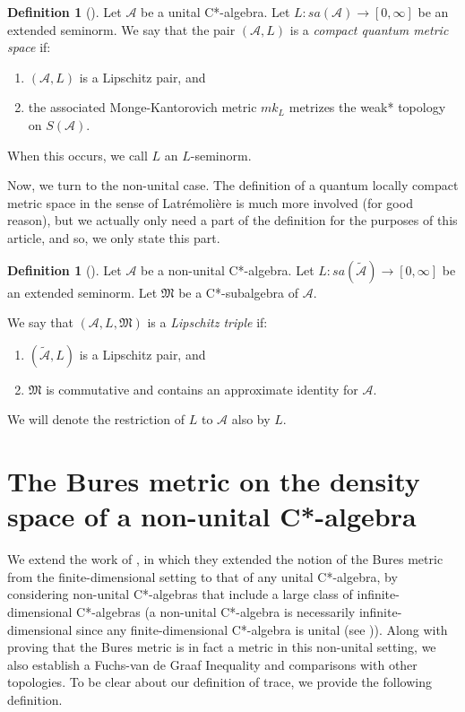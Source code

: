 \documentclass{amsart}
\theoremstyle{plain}
\theoremstyle{definition}
\newtheorem{definition}[theorem]{Definition}
\theoremstyle{remark}
\numberwithin{equation}{section}
\newcommand{\A}{{\mathcal{A}}}
\newcommand{\wt}[1]{{\widetilde{#1}}}
\newcommand{\M}{{\mathfrak{M}}}
\begin{document}
\begin{definition}[{\cite{Rieffel98a}}]\label{d:cqms}
    Let $\A$ be a unital C*-algebra. Let $L:sa(\A)\rightarrow [0,\infty]$ be an extended seminorm. We say that the pair $(\A, L)$ is a {\em compact quantum metric space} if:
    \begin{enumerate}
        \item  $(\A, L)$ is a Lipschitz pair, and 
        \item the associated   Monge-Kantorovich metric $mk_L$ 
        metrizes the weak* topology on $S(\A)$.
    \end{enumerate}
    When this occurs, we call $L$ an $L$-seminorm.
\end{definition}

Now, we turn to the non-unital case. The definition of a quantum locally compact metric space in the sense of Latr\'emoli\`ere \cite{Latremoliere12b} is much more involved (for good reason), but we actually only need a part of the definition for the purposes of this article, and so, we only state this part. 

\begin{definition}[{\cite[Definition 2.27]{Latremoliere12b}}]\label{d:l-triple}
    Let $\A$ be a non-unital C*-algebra. Let $L:sa(\wt{\A})\rightarrow [0,\infty]$ be an extended seminorm. Let  $\M$ be a C*-subalgebra of $\A.$ 
    
    We say that $(\A, L,\M)$ is a {\em Lipschitz triple} if:
    \begin{enumerate}
        \item $(\wt{\A}, L)$ is a Lipschitz pair, and
        \item $\M$ is commutative and contains an approximate identity for $\A$.
    \end{enumerate}
    We will denote the restriction of $L$ to $\A$ also by $L$.
\end{definition}


\section{The Bures metric on the density space of a non-unital C*-algebra}\label{s:non-u-bures}

We extend the work of  \cite{Farenick-Rahaman17}, in which they extended the notion of the Bures metric from the finite-dimensional setting to that of any unital C*-algebra, by considering non-unital C*-algebras that include a large class of infinite-dimensional C*-algebras (a non-unital C*-algebra is necessarily infinite-dimensional since any finite-dimensional C*-algebra is unital (see \cite[Theorem III.1.1]{Davidson})). Along with proving that the Bures metric is in fact a metric in this non-unital setting, we also establish a Fuchs-van de Graaf Inequality  and comparisons with other topologies. To be clear about our definition of trace, we provide the following definition.
\end{document}
